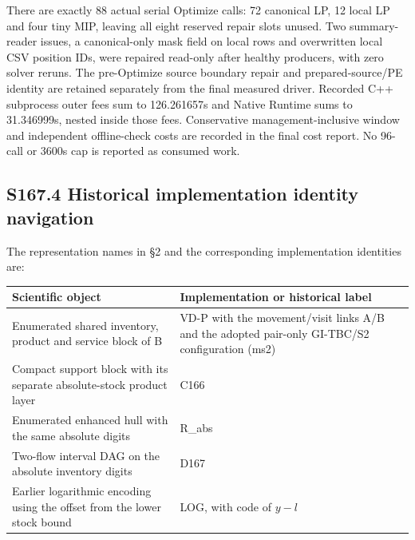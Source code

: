 \documentclass[
  american,
  11pt,
]{article}
\newcounter{none} %
\begin{document}
There are exactly 88 actual serial Optimize calls: 72 canonical LP, 12
local LP and four tiny MIP, leaving all eight reserved repair slots
unused. Two summary-reader issues, a canonical-only mask field on local
rows and overwritten local CSV position IDs, were repaired read-only
after healthy producers, with zero solver reruns. The pre-Optimize
source boundary repair and prepared-source/PE identity are retained
separately from the final measured driver. Recorded C++ subprocess outer
fees sum to 126.261657s and Native Runtime sums to 31.346999s, nested
inside those fees. Conservative management-inclusive window and
independent offline-check costs are recorded in the final cost report.
No 96-call or 3600s cap is reported as consumed work.

\subsection{S167.4 Historical implementation identity
navigation}\label{s167.4-historical-implementation-identity-navigation}

The representation names in §2 and the corresponding implementation
identities are:

\Needspace{204pt}

{\def\LTcaptype{none} %
\begin{longtable}[]{@{}
  >{\raggedright\arraybackslash}p{}
  >{\raggedright\arraybackslash}p{}@{}}
\toprule\noalign{}
\begin{minipage}[b]{\linewidth}\raggedright
Scientific object
\end{minipage} & \begin{minipage}[b]{\linewidth}\raggedright
Implementation or historical label
\end{minipage} \\
\midrule\noalign{}
\endhead
\bottomrule\noalign{}
\endlastfoot
Enumerated shared inventory, product and service block of B & VD-P with
the movement/visit links A/B and the adopted pair-only GI-TBC/S2
configuration (ms2) \\
Compact support block with its separate absolute-stock product layer &
C166 \\
Enumerated enhanced hull with the same absolute digits & R\_\allowbreak{}abs \\
Two-flow interval DAG on the absolute inventory digits & D167 \\
Earlier logarithmic encoding using the offset from the lower stock bound
& LOG, with code of \(y-l\) \\
\end{longtable}
}
\end{document}
